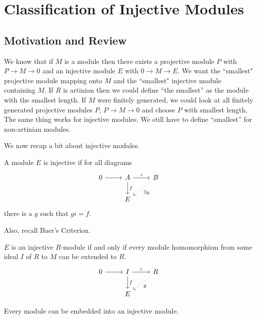 
\newpage
\section{Classification of Injective Modules}
\subsection{Motivation and Review}

We know that if $M$ is a module then there exists a projective module $P$ with $P \longrightarrow M \longrightarrow 0$ and an injective module $E$ with $0 \longrightarrow M \longrightarrow E$. We want the ``smallest" projective module mapping onto $M$ and the ``smallest" injective module containing $M$. If $R$ is artinian then we could define ``the smallest'' as the module with the smallest length. If $M$ were finitely generated, we could look at all finitely generated projective modules $P$, $P \longrightarrow M \longrightarrow 0$ and choose $P$ with smallest length. The same thing works for injective modules. We still have to define ``smallest'' for non-artinian modules. 

We now recap a bit about injective modules. 

\begin{dfn}
A module $E$ is injective if for all diagrams
\[
\begin{tikzcd}
0 \arrow{r} & A \arrow{r}{i} \arrow{d}{f} & B \arrow[dotted]{dl}{\exists g} \\
 & E & 
\end{tikzcd}
\]
there is a $g$ such that $gi=f$.
\end{dfn}

\noindent Also, recall Baer's Criterion.

\begin{thm}
$E$ is an injective $R$-module if and only if every module homomorphism from some ideal $I$ of $R$ to $M$ can be extended to $R$.
\[
\begin{tikzcd}
0 \arrow{r} & I \arrow{r}{i} \arrow{d}{f} & R \arrow[dotted]{dl}{g} \\
 & E & 
\end{tikzcd}
\]
\end{thm}

\begin{thm}
Every module can be embedded into an injective module. 
\end{thm}

